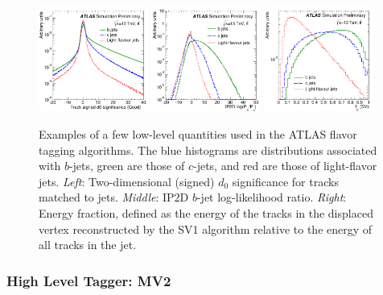 \begin{figure}[!htb]
    \begin{center}
        \includegraphics[width=0.32\textwidth]{figures/chapter3/ftag/ftag_track_d0_sig_ip2d}
        \includegraphics[width=0.32\textwidth]{figures/chapter3/ftag/ftag_ip2d_pb}
        \includegraphics[width=0.32\textwidth]{figures/chapter3/ftag/ftag_sv1_fE}
        \caption{
            Examples of a few low-level quantities used in the ATLAS flavor tagging algorithms.
            The blue histograms are distributions associated with $b$-jets, green are those of $c$-jets, and red
            are those of light-flavor jets.
            \textit{Left}: Two-dimensional (signed) $d_0$ significance for tracks matched to jets.
            \textit{Middle}: IP2D $b$-jet log-likelihood ratio.
            \textit{Right}: Energy fraction, defined as the energy of the tracks in the displaced
                vertex reconstructed by the SV1 algorithm relative to the energy of all tracks in the jet.
        }
        \label{fig:ftag_low_level_var}
    \end{center}
\end{figure}

\subsubsection{High Level Tagger: MV2}
\label{sec:ftag_high_level}

